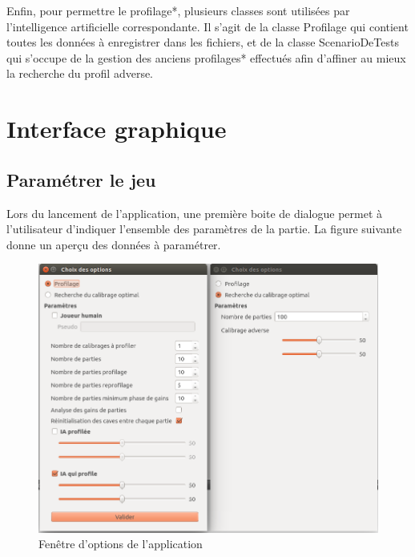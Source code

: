 \documentclass{report}
\begin{document}
Enfin, pour permettre le profilage*, plusieurs classes sont utilisées par l'intelligence artificielle correspondante. Il s'agit de la classe Profilage qui contient toutes les données à enregistrer dans les fichiers, et de la classe ScenarioDeTests qui s'occupe de la gestion des anciens profilages* effectués afin d'affiner au mieux la recherche du profil adverse.\\

\section{Interface graphique}

\subsection{Paramétrer le jeu}

\hspace{0.5cm}Lors du lancement de l'application, une première boite de dialogue permet à l'utilisateur d'indiquer l'ensemble des paramètres de la partie. La figure suivante donne un aperçu des données à paramétrer.

\begin{figure}[H]
	\begin{center}
		\includegraphics[scale=0.3]{./imagesRapport/interfaceGraphiqueFenetreOptions.png}
	\end{center}
	\caption[Fenêtre d'options de l'application]{Fenêtre d'options de l'application}
\end{figure}
\end{document}
